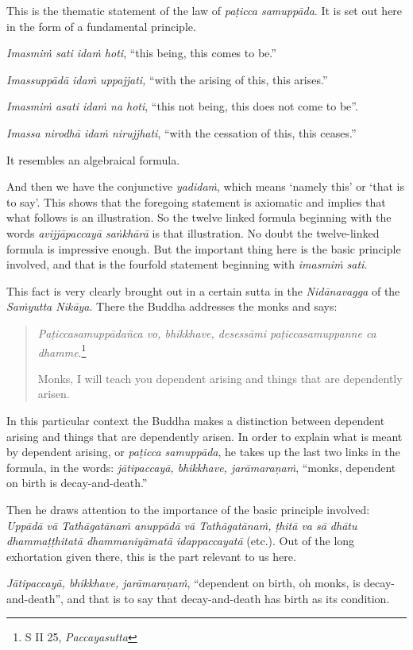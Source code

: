 This is the thematic statement of the law of \emph{paṭicca samuppāda}. It is set out here in the form of a fundamental principle.

\emph{Imasmiṁ sati idaṁ hoti}, ``this being, this comes to be.''

\emph{Imassuppādā idaṁ uppajjati,} ``with the arising of this, this arises.''

\emph{Imasmiṁ asati idaṁ na hoti}, ``this not being, this does not come to be''.

\emph{Imassa nirodhā idaṁ nirujjhati}, ``with the cessation of this, this ceases.''

It resembles an algebraical formula.

And then we have the conjunctive \emph{yadidaṁ}, which means `namely this' or `that is to say'. This shows that the foregoing statement is axiomatic and implies that what follows is an illustration. So the twelve linked formula beginning with the words \emph{avijjāpaccayā saṅkhārā} is that illustration. No doubt the twelve-linked formula is impressive enough. But the important thing here is the basic principle involved, and that is the fourfold statement beginning with \emph{imasmiṁ sati}.

This fact is very clearly brought out in a certain sutta in the \emph{Nidānavagga} of the \emph{Saṁyutta Nikāya}. There the Buddha addresses the monks and says:

\begin{quote}
\emph{Paṭiccasamuppādañca vo, bhikkhave, desessāmi paṭiccasamuppanne ca dhamme}.\footnote{S II 25, \emph{Paccayasutta}}

Monks, I will teach you dependent arising and things that are dependently arisen.
\end{quote}

In this particular context the Buddha makes a distinction between dependent arising and things that are dependently arisen. In order to explain what is meant by dependent arising, or \emph{paṭicca samuppāda}, he takes up the last two links in the formula, in the words: \emph{jātipaccayā, bhikkhave, jarāmaraṇaṁ}, ``monks, dependent on birth is decay-and-death.''

Then he draws attention to the importance of the basic principle involved: \emph{Uppādā vā Tathāgatānaṁ anuppādā vā Tathāgatānaṁ, ṭhitā va sā dhātu dhammaṭṭhitatā dhammaniyāmatā idappaccayatā} (etc.). Out of the long exhortation given there, this is the part relevant to us here.

\emph{Jātipaccayā, bhikkhave, jarāmaraṇaṁ}, ``dependent on birth, oh monks, is decay-and-death'', and that is to say that decay-and-death has birth as its condition.

